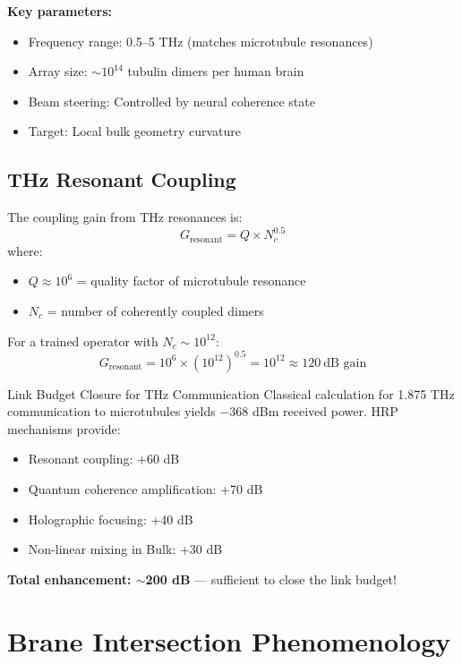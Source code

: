\textbf{Key parameters:}
\begin{itemize}
\item Frequency range: 0.5--5 THz (matches microtubule resonances)
\item Array size: $\sim10^{14}$ tubulin dimers per human brain
\item Beam steering: Controlled by neural coherence state
\item Target: Local bulk geometry curvature
\end{itemize}

\subsection{THz Resonant Coupling}

The coupling gain from THz resonances is:
\begin{equation}
G_{\text{resonant}} = Q \times N_c^{0.5}
\end{equation}
where:
\begin{itemize}
\item $Q \approx 10^6$ = quality factor of microtubule resonance
\item $N_c$ = number of coherently coupled dimers
\end{itemize}

For a trained operator with $N_c \sim 10^{12}$:
\begin{equation}
G_{\text{resonant}} = 10^6 \times (10^{12})^{0.5} = 10^{12} \approx 120\ \text{dB gain}
\end{equation}

\begin{calloutbox}{Link Budget Closure for THz Communication}
Classical calculation for 1.875 THz communication to microtubules yields $-368$ dBm received power. HRP mechanisms provide:
\begin{itemize}
\item Resonant coupling: +60 dB
\item Quantum coherence amplification: +70 dB
\item Holographic focusing: +40 dB
\item Non-linear mixing in Bulk: +30 dB
\end{itemize}
\textbf{Total enhancement: $\sim$200 dB} --- sufficient to close the link budget!
\end{calloutbox}

\section{Brane Intersection Phenomenology}

